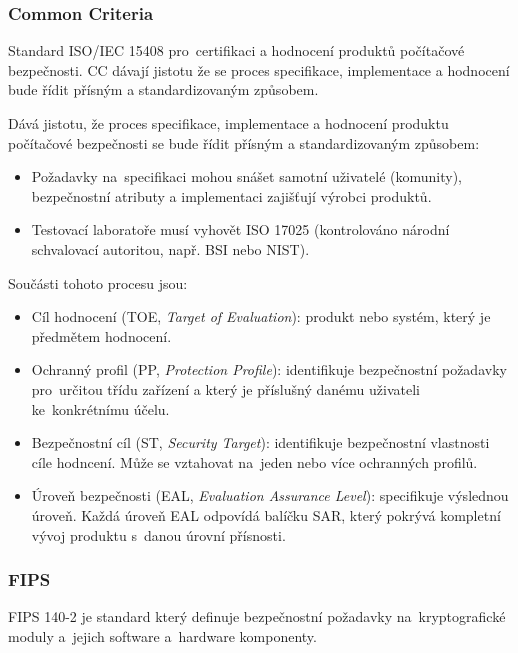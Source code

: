 \subsubsection{Common Criteria}

Standard ISO/IEC 15408 pro~certifikaci a hodnocení produktů počítačové bezpečnosti.
CC dávají jistotu že se proces specifikace, implementace a hodnocení bude řídit přísným a standardizovaným způsobem.

Dává jistotu, že proces specifikace, implementace a hodnocení produktu počítačové bezpečnosti se bude řídit přísným a standardizovaným způsobem:
\vspace*{-0.5em}\begin{itemize}
    \item Požadavky na~specifikaci mohou snášet samotní uživatelé (komunity), bezpečnostní atributy a implementaci zajišťují výrobci produktů.
    \item Testovací laboratoře musí vyhovět ISO 17025 (kontrolováno národní schvalovací autoritou, např. BSI nebo NIST).
\end{itemize}

Součásti tohoto procesu jsou:
\vspace*{-0.5em}\begin{itemize}
\item
	Cíl hodnocení (TOE, \emph{Target of Evaluation}):
	produkt nebo systém, který je předmětem hodnocení.
\item
	Ochranný profil (PP, \emph{Protection Profile}):
	identifikuje bezpečnostní požadavky pro~určitou třídu zařízení a který je příslušný danému uživateli ke~konkrétnímu účelu.
\item
	Bezpečnostní cíl (ST, \emph{Security Target}):
	identifikuje bezpečnostní vlastnosti cíle hodncení.
	Může se vztahovat na~jeden nebo více ochranných profilů.
\item
	Úroveň bezpečnosti (EAL, \emph{Evaluation Assurance Level}):
	specifikuje výslednou úroveň.
	Každá úroveň EAL odpovídá balíčku SAR, který pokrývá kompletní vývoj produktu s~danou úrovní přísnosti.
\end{itemize}


\subsubsection{FIPS}

FIPS 140-2 je standard který definuje bezpečnostní požadavky na~kryptografické moduly a~jejich software a~hardware komponenty.

